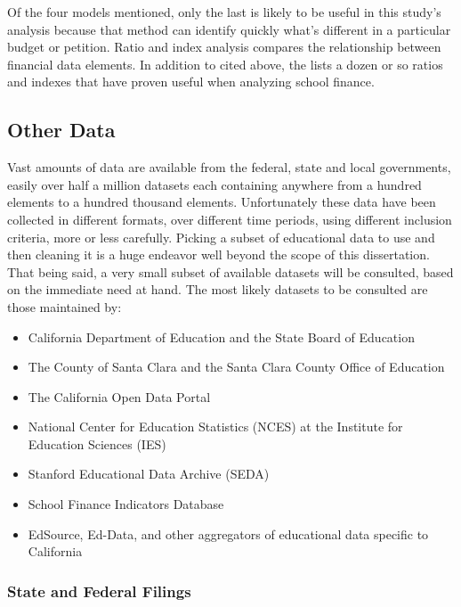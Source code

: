 Of the four models mentioned, only the last is likely to be useful in this study's analysis because that method can identify quickly what's different in a particular budget or petition. Ratio and index analysis compares the relationship between financial data elements. In addition to \textcite{Baker.Richards2004} cited above, the \textcite[35–44]{NFES2007} lists a dozen or so ratios and indexes that have proven useful when analyzing school finance. 

\subsection{Other Data}\label{sec:other-data}\indent

Vast amounts of data are available from the federal, state and  local governments, easily over half a million datasets each containing anywhere from a hundred elements to a hundred thousand elements. Unfortunately these data have been collected in different formats, over different time periods, using different inclusion criteria, more or less carefully. Picking a subset of educational data to use and then cleaning it is a huge endeavor well beyond the scope of this dissertation. That being said, a very small subset of available datasets will be consulted, based on the immediate need at hand. The most likely datasets to be consulted are those maintained by:

\begin{itemize}
  \item California Department of Education and the State Board of Education
  \item The County of Santa Clara and the Santa Clara County Office of Education
  \item The California Open Data Portal
  \item National Center for Education Statistics (NCES) at the Institute for Education Sciences (IES)
  \item Stanford Educational Data Archive (SEDA)
  \item School Finance Indicators Database
  \item EdSource, Ed-Data, and other aggregators of educational data specific to California
\end{itemize}

\subsubsection{State and Federal Filings}\indent


